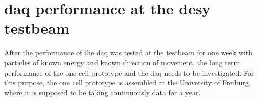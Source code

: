 \chapter{\ac{daq} performance at the \ac{desy} testbeam}








After the performance of the \ac{daq} was tested at the testbeam for one week with particles of known energy and known direction of movement, the long term performance of the one cell prototype and the \ac{daq} needs to be investigated.
For this purpose, the one cell prototype is assembled at the University of Freiburg, where it is supposed to be taking continuously data for a year.
